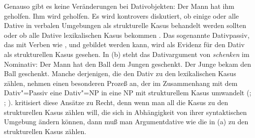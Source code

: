 Genauso gibt es keine Veränderungen bei Dativobjekten:
\eal
\ex Der Mann hat ihm geholfen.
\ex Ihm wird geholfen.
\zl
Es wird kontrovers diskutiert, ob einige oder alle Dative in verbalen Umgebungen als
strukturelle Kasus behandelt werden sollten \citep{denBesten85,denBesten85b,Fanselow87a,Fanselow2000b,%
Fanselow2003b,%
Czepluch88,Wegener90,Sternefeld95a,%
Stechow96a,Wunderlich97a,Wunderlich97c,Ryu97a,Molnarfi98a,Gunkel2003b}
oder ob alle Dative lexikalischen Kasus bekommen \citep{Haider85b,Haider86,Haider93a,%
HR2003a,%
HM94a,%
Scherpenisse86a,%
Pollard94a,Mueller99a,Mueller2001a,Meurers99b,VS98a,Abraham95a-u,%
McIntyre2006a}. %
%
%
Das sogenannte Dativpassiv, das mit Verben wie
,  und  gebildet werden kann,
wird als Evidenz für den Dativ als strukturellen Kasus gesehen.
In (b) steht das Dativargument von \emph{schenken} im Nominativ:
\eal
\ex Der Mann  hat   den Ball dem Jungen geschenkt.
\ex Der Junge bekam den Ball            geschenkt.
\zl
Manche derjenigen, die den Dativ zu den lexikalischen Kasus zählen, nehmen
einen besonderen Prozeß an, der im Zusammenhang mit dem Dativ"=Passiv
eine Dativ"=NP in eine NP mit strukturellem Kasus umwandelt 
(\citealp[Abschnitt~4.1]{Haider86}; \citealp[]{HM94a}; \citealp[]{Mueller99a}).
\citet{Gunkel2003b} kritisiert diese Ansätze zu Recht, denn wenn man all die
Kasus zu den strukturellen Kasus zählen will, die sich in Abhängigkeit von
ihrer syntaktischen Umgebung ändern können, dann muß man Argumentdative wie die
in (a) zu den strukturellen Kasus zählen.

